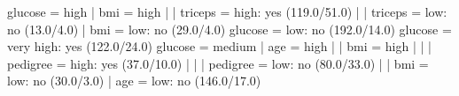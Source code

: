 glucose = high
|   bmi = high
|   |   triceps = high: yes (119.0/51.0)
|   |   triceps = low: no (13.0/4.0)
|   bmi = low: no (29.0/4.0)
glucose = low: no (192.0/14.0)
glucose = very high: yes (122.0/24.0)
glucose = medium
|   age = high
|   |   bmi = high
|   |   |   pedigree = high: yes (37.0/10.0)
|   |   |   pedigree = low: no (80.0/33.0)
|   |   bmi = low: no (30.0/3.0)
|   age = low: no (146.0/17.0)
